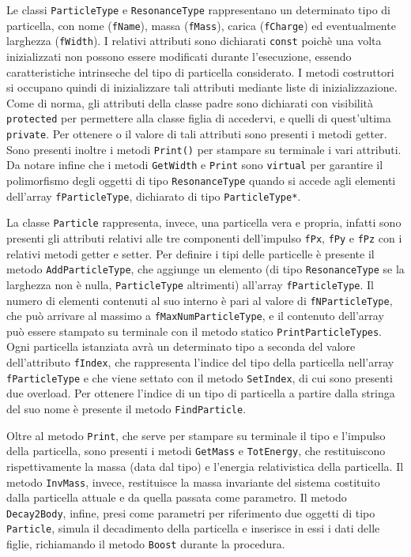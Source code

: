 \documentclass{article}
\begin{document}
Le classi \texttt{ParticleType} e \texttt{ResonanceType} rappresentano un determinato tipo di particella, con nome (\texttt{fName}), massa (\texttt{fMass}), carica (\texttt{fCharge}) ed eventualmente larghezza (\texttt{fWidth}). I relativi attributi sono dichiarati \texttt{const} poichè una volta inizializzati non possono essere modificati durante l'esecuzione, essendo caratteristiche intrinseche del tipo di particella considerato. I metodi costruttori si occupano quindi di inizializzare tali attributi mediante liste di inizializzazione. Come di norma, gli attributi della classe padre sono dichiarati con visibilità \texttt{protected} per permettere alla classe figlia di accedervi, e quelli di quest'ultima \texttt{private}. Per ottenere o il valore di tali attributi
sono presenti i metodi getter. Sono presenti inoltre i metodi \texttt{Print()} per stampare su terminale i vari attributi. Da notare infine che i metodi \texttt{GetWidth} e \texttt{Print} sono \texttt{virtual} per garantire il polimorfismo degli oggetti di tipo \texttt{ResonanceType} quando si accede agli elementi dell'array \texttt{fParticleType}, dichiarato di tipo \texttt{ParticleType*}.

La classe \texttt{Particle} rappresenta, invece, una particella vera e propria, infatti sono presenti gli attributi relativi alle tre componenti dell'impulso \texttt{fPx}, \texttt{fPy} e \texttt{fPz} con i relativi metodi getter e setter. Per definire i tipi delle particelle è presente il metodo \texttt{AddParticleType}, che aggiunge un elemento (di tipo \texttt{ResonanceType} se la larghezza non è nulla, \texttt{ParticleType} altrimenti) all'array \texttt{fParticleType}. Il numero di elementi contenuti al suo interno è pari al valore di \texttt{fNParticleType}, che può arrivare al massimo a \texttt{fMaxNumParticleType}, e il contenuto dell'array può essere stampato su terminale con il metodo statico \texttt{PrintParticleTypes}. Ogni particella istanziata avrà un determinato tipo a seconda del valore dell'attributo \texttt{fIndex}, che rappresenta l'indice del tipo della particella nell'array \texttt{fParticleType} e che viene settato con il metodo \texttt{SetIndex}, di cui sono presenti due overload. Per ottenere l'indice di un tipo di particella a partire dalla stringa del suo nome è presente il metodo \texttt{FindParticle}.

Oltre al metodo \texttt{Print}, che serve per stampare su terminale il tipo e l'impulso della particella, sono presenti i metodi \texttt{GetMass} e \texttt{TotEnergy}, che restituiscono rispettivamente la massa (data dal tipo) e l'energia relativistica della particella. Il metodo \texttt{InvMass}, invece, restituisce la massa invariante del sistema costituito dalla particella attuale e da quella passata come parametro. Il metodo \texttt{Decay2Body}, infine, presi come parametri per riferimento due oggetti di tipo \texttt{Particle}, simula il decadimento della particella e inserisce in essi i dati delle figlie, richiamando il metodo \texttt{Boost} durante la procedura.
\end{document}
